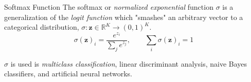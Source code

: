 \documentclass{cognito}
\begin{document}

\begin{note}{Softmax Function}
	The softmax or {\it normalized exponential} function $\sigma$ is a generalization of the {\it logit function}
	which "smashes" an arbitrary vector to a categorical distribution, $\sigma : \bm z \in \mathbb{R}^K \to (0, 1)^K$.
	$$
		\sigma(\bm z)_i = \frac{e^{z_i}}{\sum_j e^{z_j}}, \quad \quad \sum_i \sigma(\bm z)_i = 1
	$$
	\begin{remark} $\sigma$ is used is {\it multiclass classification},  linear discriminant analysis, naive Bayes classifiers, and artificial neural networks.
	\end{remark}
	\vspace{-5pt}
\end{note}






\end{document}
